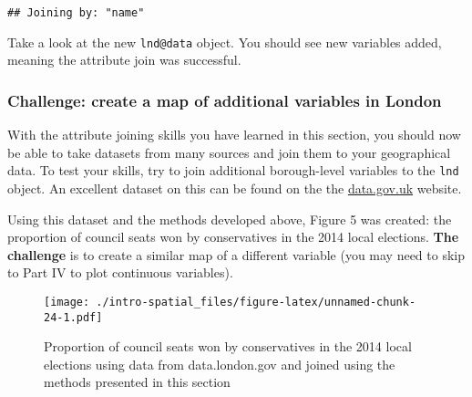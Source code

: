 \documentclass[]{article}
\newenvironment{Shaded}{}{}
\newcommand{\KeywordTok}[1]{\textcolor[rgb]{0.00,0.44,0.13}{\textbf{{#1}}}}
\newcommand{\DataTypeTok}[1]{\textcolor[rgb]{0.56,0.13,0.00}{{#1}}}
\newcommand{\StringTok}[1]{\textcolor[rgb]{0.25,0.44,0.63}{{#1}}}
\newcommand{\CommentTok}[1]{\textcolor[rgb]{0.38,0.63,0.69}{\textit{{#1}}}}
\newcommand{\NormalTok}[1]{{#1}}
\begin{document}
\begin{Shaded}
\end{Shaded}

\begin{verbatim}
## Joining by: "name"
\end{verbatim}

Take a look at the new \texttt{lnd@data} object. You should see new
variables added, meaning the attribute join was successful.

\subsubsection{Challenge: create a map of additional variables in
London}\label{challenge-create-a-map-of-additional-variables-in-london}

With the attribute joining skills you have learned in this section, you
should now be able to take datasets from many sources and join them to
your geographical data. To test your skills, try to join additional
borough-level variables to the \texttt{lnd} object. An excellent dataset
on this can be found on the the
\href{http://data.london.gov.uk/dataset/london-borough-profiles}{data.gov.uk}
website.

Using this dataset and the methods developed above, Figure 5 was
created: the proportion of council seats won by conservatives in the
2014 local elections. \textbf{The challenge} is to create a similar map
of a different variable (you may need to skip to Part IV to plot
continuous variables).

\begin{figure}[htbp]
\centering
\texttt{[image: ./intro-spatial\_files/figure-latex/unnamed-chunk-24-1.pdf]}
\caption{Proportion of council seats won by conservatives in the 2014
local elections using data from data.london.gov and joined using the
methods presented in this section}
\end{figure}
\end{document}
